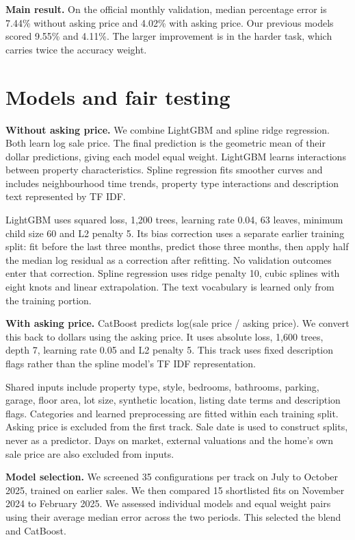 \documentclass[10pt]{article}
\begin{document}
\textbf{Main result.} On the official monthly validation, median percentage error is 7.44\% without asking price and 4.02\% with asking price. Our previous models scored 9.55\% and 4.11\%. The larger improvement is in the harder task, which carries twice the accuracy weight.

\newpage
\section{Models and fair testing}
\textbf{Without asking price.} We combine LightGBM and spline ridge regression. Both learn log sale price. The final prediction is the geometric mean of their dollar predictions, giving each model equal weight. LightGBM learns interactions between property characteristics. Spline regression fits smoother curves and includes neighbourhood time trends, property type interactions and description text represented by TF IDF.

LightGBM uses squared loss, 1,200 trees, learning rate 0.04, 63 leaves, minimum child size 60 and L2 penalty 5. Its bias correction uses a separate earlier training split: fit before the last three months, predict those three months, then apply half the median log residual as a correction after refitting. No validation outcomes enter that correction. Spline regression uses ridge penalty 10, cubic splines with eight knots and linear extrapolation. The text vocabulary is learned only from the training portion.

\textbf{With asking price.} CatBoost predicts log(sale price / asking price). We convert this back to dollars using the asking price. It uses absolute loss, 1,600 trees, depth 7, learning rate 0.05 and L2 penalty 5. This track uses fixed description flags rather than the spline model's TF IDF representation.

Shared inputs include property type, style, bedrooms, bathrooms, parking, garage, floor area, lot size, synthetic location, listing date terms and description flags. Categories and learned preprocessing are fitted within each training split. Asking price is excluded from the first track. Sale date is used to construct splits, never as a predictor. Days on market, external valuations and the home's own sale price are also excluded from inputs.

\textbf{Model selection.} We screened 35 configurations per track on July to October 2025, trained on earlier sales. We then compared 15 shortlisted fits on November 2024 to February 2025. We assessed individual models and equal weight pairs using their average median error across the two periods. This selected the blend and CatBoost.
\end{document}
